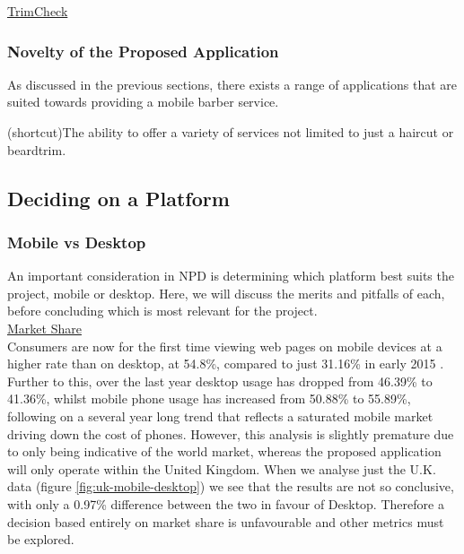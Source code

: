 \documentclass[12pt]{article}
\begin{document}
	\noindent
	\underline{TrimCheck}
	
	
	\subsubsection{Novelty of the Proposed Application}
	As discussed in the previous sections, there exists a range of applications that are suited towards providing a mobile barber service.
	
	(shortcut)The ability to offer a variety of services not limited to just a haircut or beardtrim.
	
	\subsection{Deciding on a Platform}
	\label{chap:platform}
	\subsubsection{Mobile vs Desktop}
	An important consideration in NPD is determining which platform best suits the project, mobile or desktop. Here, we will discuss the merits and pitfalls of each, before concluding which is most relevant for the project. 
	\\
	
	\noindent
	\underline{Market Share}
	\\
	\noindent
	Consumers are now for the first time viewing web pages on mobile devices at a higher rate than on desktop, at 54.8\%, compared to just 31.16\% in early 2015 \cite{MobilePercentageWebsite2021}. Further to this, over the last year desktop usage has dropped from 46.39\% to 41.36\%, whilst mobile phone usage has increased from 50.88\% to 55.89\%, following on a several year long trend \cite{DesktopVsMobile2021} that reflects a saturated mobile market driving down the cost of phones. However, this analysis is slightly premature due to only being indicative of the world market, whereas the proposed application will only operate within the United Kingdom. When we analyse just the U.K. data (figure \ref{fig:uk-mobile-desktop}) we see that the results are not so conclusive, with only a 0.97\% difference between the two in favour of Desktop. Therefore a decision based entirely on market share is unfavourable and other metrics must be explored.
	
\end{document}

